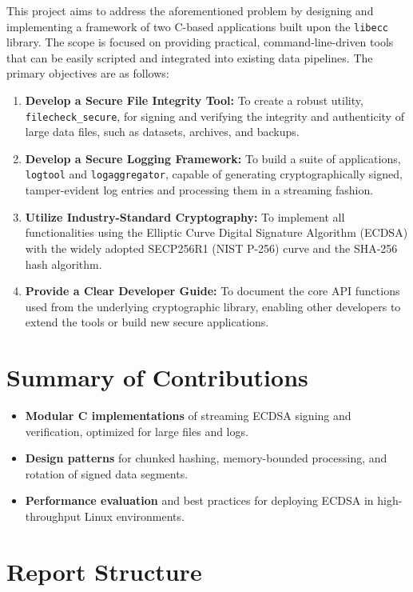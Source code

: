 This project aims to address the aforementioned problem by designing and implementing a framework of two C-based applications built upon the \texttt{libecc} library. The scope is focused on providing practical, command-line-driven tools that can be easily scripted and integrated into existing data pipelines. The primary objectives are as follows:
\begin{enumerate}
	\item \textbf{Develop a Secure File Integrity Tool:} To create a robust utility, \texttt{filecheck\_secure}, for signing and verifying the integrity and authenticity of large data files, such as datasets, archives, and backups.
	\item \textbf{Develop a Secure Logging Framework:} To build a suite of applications, \texttt{logtool} and \texttt{logaggregator}, capable of generating cryptographically signed, tamper-evident log entries and processing them in a streaming fashion.
	\item \textbf{Utilize Industry-Standard Cryptography:} To implement all functionalities using the Elliptic Curve Digital Signature Algorithm (ECDSA) with the widely adopted SECP256R1 (NIST P-256) curve and the SHA-256 hash algorithm.
	\item \textbf{Provide a Clear Developer Guide:} To document the core API functions used from the underlying cryptographic library, enabling other developers to extend the tools or build new secure applications.
\end{enumerate}

\section{Summary of Contributions}

\begin{itemize}
	\item \textbf{Modular C implementations} of streaming ECDSA signing and verification, optimized for large files and logs.  
	\item \textbf{Design patterns} for chunked hashing, memory-bounded processing, and rotation of signed data segments.  
	\item \textbf{Performance evaluation} and best practices for deploying ECDSA in high-throughput Linux environments.  
\end{itemize}

\section{Report Structure}

